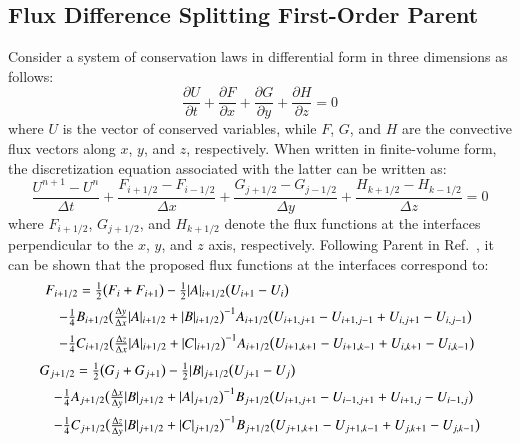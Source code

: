 \documentclass{warpdoc}
\newcommand{\alb}{\vspace{0.2cm}\\} %
\begin{document}
\subsection{Flux Difference Splitting First-Order Parent}

Consider a system of conservation laws in differential form in three dimensions as follows:
%
\begin{equation}
 \frac{\partial U}{\partial t} + \frac{\partial F}{\partial x} + \frac{\partial G}{\partial y} + \frac{\partial H}{\partial z} =0
\end{equation}
%
where $U$ is the vector of conserved variables, while $F$, $G$, and $H$ are the convective flux vectors along $x$, $y$, and $z$, respectively. When written in finite-volume form, the discretization equation associated with the latter can be written as:
%
\begin{equation}
  \frac{U^{n+1}-U^{n}}{\Delta t} + \frac{F_{i+1/2}-F_{i-1/2}}{\Delta x} + \frac{G_{j+1/2}-G_{j-1/2}}{\Delta y}
+ \frac{H_{k+1/2}-H_{k-1/2}}{\Delta z} = 0
\end{equation}
%
where $F_{i+1/2}$, $G_{j+1/2}$, and $H_{k+1/2}$ denote the flux functions at the interfaces perpendicular to the $x$, $y$, and $z$ axis, respectively. Following Parent in Ref.\ \cite{aiaa:2015:parent}, it can be shown that the proposed flux functions at the interfaces correspond to:  
%
\begin{equation}
\begin{array}{l}
 F_{i+1/2}=
    \frac{1}{2}\bigl(F_i+F_{i+1}\bigr) 
  -\frac{1}{2}|A|_{i+1/2} \bigl( U_{i+1}- U_i\bigr) \alb
~~~~  - \frac{1}{4} {B_{i+1/2}}\bigl(\frac{\Delta y}{\Delta x}|A|_{i+1/2}  + |B|_{i+1/2} \bigr)^{-1} A_{i+1/2} \bigl( U_{i+1,j+1} -U_{i+1,j-1}+U_{i,j+1} -U_{i,j-1}\bigr)\alb
~~~~  - \frac{1}{4} {C_{i+1/2}}\bigl(\frac{\Delta z}{\Delta x}|A|_{i+1/2}  + |C|_{i+1/2} \bigr)^{-1} A_{i+1/2}\bigl(U_{i+1,k+1} -U_{i+1,k-1}+U_{i,k+1} -U_{i,k-1}\bigr)
\end{array}
\end{equation}
%
%
\begin{equation}
\begin{array}{l}
 G_{j+1/2}=
    \frac{1}{2}\bigl(G_{j}+G_{j+1}\bigr) 
  -\frac{1}{2}|B|_{j+1/2} \bigl( U_{j+1}- U_j\bigr) \alb
~~~~  - \frac{1}{4} {A_{j+1/2}}\bigl(\frac{\Delta x}{\Delta y}|B|_{j+1/2}  + |A|_{j+1/2} \bigr)^{-1} B_{j+1/2} \bigl( U_{i+1,j+1}-U_{i-1,j+1} +U_{i+1,j}-U_{i-1,j}\bigr)\alb
~~~~  - \frac{1}{4} {C_{j+1/2}}\bigl(\frac{\Delta z}{\Delta y}|B|_{j+1/2}  + |C|_{j+1/2} \bigr)^{-1} B_{j+1/2}\bigl(U_{j+1,k+1} - U_{j+1,k-1} + U_{j,k+1} - U_{j,k-1}\bigr)
\end{array}
\end{equation}
\end{document}
